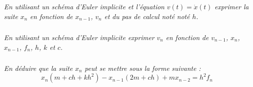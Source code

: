 \documentclass[10pt]{article}
\newif\ifprof
\begin{document}
\subparagraph{}
\textit{En utilisant un schéma d'Euler implicite et l'équation $v(t) = \dot{x}(t)$ 
exprimer la suite $x_{n}$ en fonction de $x_{n-1}$, $v_n$ et du pas de calcul noté noté $h$.}

\ifprof
\begin{corrige}
On a $\dfrac{dx(t)}{dt} \simeq \dfrac{x_{n}-x_ {n-1}}{h}$. On a donc 
$v_n = \dfrac{x_{n}-x_{n-1}}{h} \Longleftrightarrow x_{n} = h\cdot v_n + x_{n-1}$.

\end{corrige}
\else
\fi


\subparagraph{}
\textit{En utilisant un schéma d'Euler implicite exprimer $v_n$ en fonction de $v_{n-1}$, $x_{n}$, $x_{n-1}$, $f_n$, $h$, $k$ et $c$.}

\ifprof
\begin{corrige}

On a $\dfrac{dv(t)}{dt} \simeq \dfrac{v_{n}-v_ {n-1}}{h}$. On a donc 
$\dot{v}_n = \dfrac{v_{n}-v_{n-1}}{h} \Longleftrightarrow v_{n} = h\cdot \dot{v}_n + v_{n-1}$.


$$
m\cdot \dfrac{v_{n}-v_{n-1}}{h} +c\cdot \dfrac{x_{n}-x_{n-1}}{h} + k\cdot x_n = f_n
\Longleftrightarrow
m\cdot (v_{n}-v_{n-1}) +c\cdot (x_{n}-x_{n-1}) + kh\cdot x_n = hf_n
$$


On a donc :
$$
mv_{n}  = hf_n -  (kh+c) \cdot x_n + mv_{n-1}+cx_{n-1}
$$

\end{corrige}
\else
\fi

\subparagraph{}
\textit{En déduire que la suite $x_n$ peut se mettre sous la forme suivante :}
$$
x_{n}\left(m +ch+ kh^2\right)-x_{n-1}(2m+ch) +mx_{n-2}= h^2f_n
$$

\ifprof
\begin{corrige}

D'après la question 2 on a :
$$v_n = \dfrac{x_{n}-x_{n-1}}{h} \quad \text{et} \quad v_{n-1} = \dfrac{x_{n-1}-x_{n-2}}{h}$$ 

En utilisant le résultat de la question 3, on a :
$$
m\dfrac{x_{n}-x_{n-1}}{h}  = hf_n -  (kh+c) \cdot x_n + m\dfrac{x_{n-1}-x_{n-2}}{h}+cx_{n-1}
$$

$$
\Longleftrightarrow 
m(x_{n}-x_{n-1}) = h^2f_n -  h(kh+c) \cdot x_n + m(x_{n-1}-x_{n-2})+chx_{n-1}
$$

$$
\Longleftrightarrow 
m(x_{n}-x_{n-1}) +  h(kh+c) \cdot x_n - m(x_{n-1}-x_{n-2})-chx_{n-1} = h^2f_n 
$$


$$
\Longleftrightarrow 
x_{n}\left(m +kh^2+ch\right)-x_{n-1}(2m+ch) +mx_{n-2} = h^2f_n 
$$

$$
\Longleftrightarrow 
x_{n}= \dfrac{1}{m +kh^2+ch} \left(h^2f_n +x_{n-1}(2m+ch) -mx_{n-2} \right)
$$

\end{corrige}
\else
\fi
\end{document}
